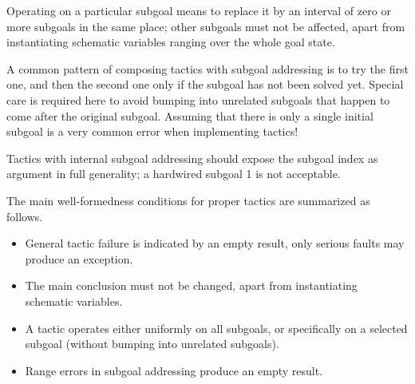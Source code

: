 \begin{isabellebody}
\begin{isamarkuptext}
  Operating on a particular subgoal means to replace it by an interval
  of zero or more subgoals in the same place; other subgoals must not
  be affected, apart from instantiating schematic variables ranging
  over the whole goal state.

  A common pattern of composing tactics with subgoal addressing is to
  try the first one, and then the second one only if the subgoal has
  not been solved yet.  Special care is required here to avoid bumping
  into unrelated subgoals that happen to come after the original
  subgoal.  Assuming that there is only a single initial subgoal is a
  very common error when implementing tactics!

  Tactics with internal subgoal addressing should expose the subgoal
  index as  argument in full generality; a hardwired
  subgoal 1 is not acceptable.
  
  \medskip The main well-formedness conditions for proper tactics are
  summarized as follows.

  \begin{itemize}

  \item General tactic failure is indicated by an empty result, only
  serious faults may produce an exception.

  \item The main conclusion must not be changed, apart from
  instantiating schematic variables.

  \item A tactic operates either uniformly on all subgoals, or
  specifically on a selected subgoal (without bumping into unrelated
  subgoals).

  \item Range errors in subgoal addressing produce an empty result.

  \end{itemize}


\end{isamarkuptext}
\end{isabellebody}
